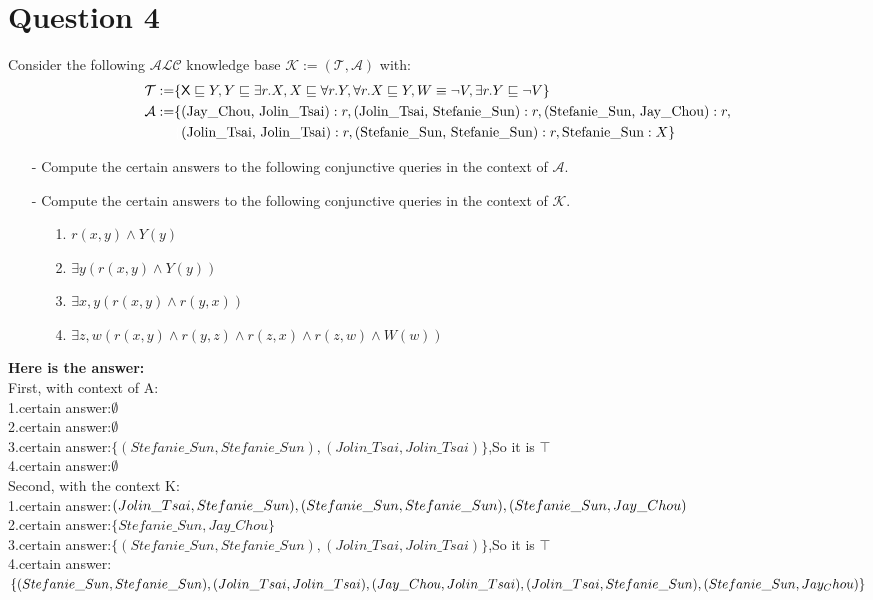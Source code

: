 \documentclass{article}
\begin{document}
	\section{Question 4}
    Consider the following $\mathcal{ALC}$ knowledge base $\mathcal{K}:=(\mathcal{T},\mathcal{A})$ with:
    \begin{align*}
        \mathcal{T} := & \{\textsf{$\textsf{X}\sqsubseteq Y, Y\sqsubseteq\exists r.X, X\sqsubseteq\forall r.Y, \forall r.X\sqsubseteq Y, W\equiv\neg V, \exists r.Y\sqsubseteq\neg V$}\}\\
        \mathcal{A} := & \{\text{(Jay\_Chou, Jolin\_Tsai)} : r, \text{(Jolin\_Tsai, Stefanie\_Sun)} : r, \text{(Stefanie\_Sun, Jay\_Chou)} : r,\\
        & \text{\textcolor{white}{\{}(Jolin\_Tsai, Jolin\_Tsai)} : r, \text{(Stefanie\_Sun, Stefanie\_Sun)} : r, \text{Stefanie\_Sun} : X\}
    \end{align*}
    \begin{itemize}
        \item[-] Compute the certain answers to the following conjunctive queries in the context of $\mathcal{A}$.
        \item[-] Compute the certain answers to the following conjunctive queries in the context of $\mathcal{K}$.
        \item[]\begin{itemize}
            \item[1.] $r(x, y)\wedge Y(y)$
            \item[2.] $\exists y(r(x, y)\wedge Y(y))$
            \item[3.] $\exists x,y(r(x, y)\wedge r(y, x))$
            \item[4.] $\exists z,w(r(x, y)\wedge r(y, z)\wedge r(z, x)\wedge r(z, w)\wedge W(w))$
        \end{itemize}
    \end{itemize}
    \textbf{Here is the answer:}\\
    First, with context of A:\\
    1.certain answer:$\emptyset$\\
    2.certain answer:$\emptyset$\\
    3.certain answer:$\{(Stefanie\_Sun, Stefanie\_Sun),(Jolin\_Tsai, Jolin\_Tsai)\}$,So it is $\top$\\
    4.certain answer:$\emptyset$\\

    Second, with the context K:\\
    1.certain answer:$(Jolin\_Tsai, Stefanie\_Sun),(Stefanie\_Sun, Stefanie\_Sun),\\
    (Stefanie\_Sun, Jay\_Chou)$\\
    2.certain answer:$\{Stefanie\_Sun, Jay\_Chou\}$\\
    3.certain answer:$\{(Stefanie\_Sun, Stefanie\_Sun),(Jolin\_Tsai, Jolin\_Tsai)\}$,So it is $\top$\\
    4.certain answer:$\{(Stefanie\_Sun, Stefanie\_Sun), (Jolin\_Tsai, Jolin\_Tsai),\\
     (Jay\_Chou, Jolin\_Tsai), (Jolin\_Tsai, Stefanie\_Sun),(Stefanie\_Sun, Jay_Chou)\}$\\
\end{document}
